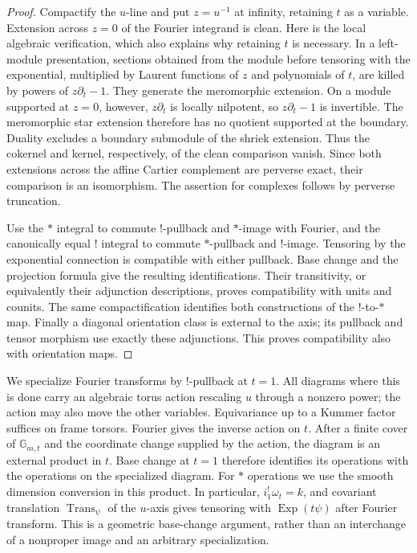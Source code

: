 \documentclass[11pt]{article}
\numberwithin{equation}{section}
\theoremstyle{definition}
\theoremstyle{remark}
\begin{document}
\begin{proof}
Compactify the $u$-line and put $z=u^{-1}$ at infinity, retaining $t$
as a variable.  Extension across $z=0$ of the Fourier integrand is
clean.  Here is the local algebraic verification, which also explains
why retaining $t$ is necessary.  In a left-module presentation,
sections obtained from the module before tensoring with the
exponential, multiplied by Laurent functions of $z$ and polynomials
of $t$, are killed by powers of $z\partial_t-1$.  They generate the
meromorphic extension.  On a module supported at $z=0$, however,
$z\partial_t$ is locally nilpotent, so $z\partial_t-1$ is invertible.
The meromorphic star extension therefore has no quotient supported at
the boundary.  Duality excludes a boundary submodule of the
shriek extension.  Thus the cokernel and kernel, respectively,
of the clean comparison vanish.  Since both
extensions across the affine Cartier complement are perverse exact,
their comparison is an isomorphism.  The assertion for complexes
follows by perverse truncation.

Use the $*$ integral to commute $!$-pullback and $*$-image with
Fourier, and the canonically equal $!$ integral to commute $*$-pullback
and $!$-image.  Tensoring by the exponential connection is compatible
with either pullback.  Base change and the projection formula give
the resulting identifications.  Their transitivity, or equivalently
their adjunction descriptions, proves compatibility with units and
counits.  The same compactification identifies both constructions of
the $!$-to-$*$ map.  Finally a diagonal orientation class is external
to the axis; its pullback and tensor morphism use exactly these
adjunctions.  This proves compatibility also with orientation maps.
\end{proof}

We specialize Fourier transforms by $!$-pullback at $t=1$.  All
diagrams where this is done carry an algebraic torus action rescaling
$u$ through a nonzero power; the action may also move the other
variables.  Equivariance up to a Kummer factor suffices on frame
torsors.  Fourier gives the inverse action on $t$.  After a finite
cover of $\mathbb G_{m,t}$ and the coordinate change supplied by the
action, the diagram is an external product in $t$.  Base change at
$t=1$ therefore identifies its operations with the operations on the
specialized diagram.  For $*$ operations we use the smooth dimension
conversion in this product.  In particular,
$i_1^!\omega_t=k$, and covariant translation
$\operatorname{Trans}_{\psi}$ of the $u$-axis gives tensoring with
$\operatorname{Exp}(t\psi)$ after Fourier transform.  This is a
geometric base-change argument, rather than an interchange of a
nonproper image and an arbitrary specialization.
\end{document}
